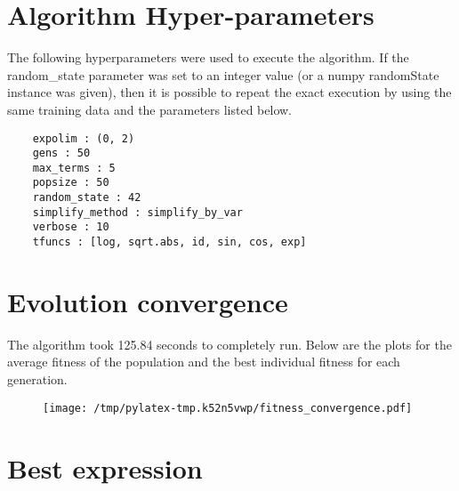 \documentclass{article}%
\begin{document}
%
\vfill \pagebreak

%
\section*{Algorithm Hyper-parameters}%
\label{sec:AlgorithmHyper{-}parameters}%

                The following hyperparameters were used to execute the
                algorithm. If the random\_state parameter was set to an 
                integer value (or a numpy randomState instance was given), then
                it is possible to repeat the exact execution by using the same
                training data and the parameters listed below.%
{\footnotesize \begin{verbatim}    expolim : (0, 2)
    gens : 50
    max_terms : 5
    popsize : 50
    random_state : 42
    simplify_method : simplify_by_var
    verbose : 10
    tfuncs : [log, sqrt.abs, id, sin, cos, exp]\end{verbatim} } \vfill \pagebreak

%

            \chead{}
            \rhead{\today, \currenttime}
            
            \lfoot{}
            \cfoot{}
            \rfoot{\thepage\ | \pageref{LastPage}}
\section*{Evolution convergence}%
\label{sec:Evolutionconvergence}%

                The algorithm took 125.84 seconds to
                completely run. Below are the plots for the average fitness
                of the population and the best individual fitness for each
                generation.\vfill%


\begin{figure}[H]%
\centering%
\texttt{[image: /tmp/pylatex-tmp.k52n5vwp/fitness\_convergence.pdf]}%
\end{figure}

%
\vfill \pagebreak

%
\section*{Best expression}%
\label{sec:Bestexpression}%
\end{document}
